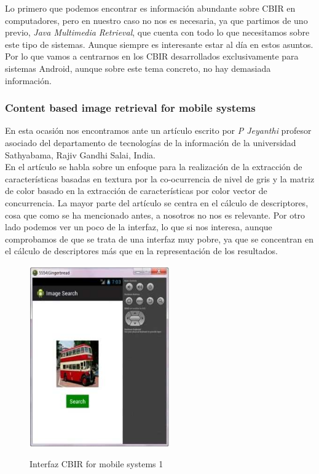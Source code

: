 Lo primero que podemos encontrar es información abundante sobre CBIR en computadores, pero en nuestro caso no nos es necesaria, ya que partimos de uno previo, \textit{Java Multimedia Retrieval}, que cuenta con todo lo que necesitamos sobre este tipo de sistemas. Aunque siempre es interesante estar al día en estos asuntos.\\

Por lo que vamos a centrarnos en los CBIR desarrollados exclusivamente para sistemas Android, aunque sobre este tema concreto, no hay demasiada información.

\subsubsection{Content based image retrieval for mobile systems}

En esta ocasión nos encontramos ante un artículo escrito por \textit{P Jeyanthi} profesor asociado del departamento de tecnologías de la información de la universidad Sathyabama, Rajiv Gandhi Salai, India.\\

En el artículo se habla sobre un enfoque para la realización de la extracción de características basadas en textura por la co-ocurrencia de nivel de gris y la matriz de color basado en la extracción de características por color vector de concurrencia. La mayor parte del artículo se centra en el cálculo de descriptores, cosa que como se ha mencionado antes, a nosotros no nos es relevante. Por otro lado podemos ver un poco de la interfaz, lo que si nos interesa, aunque comprobamos de que se trata de una interfaz muy pobre, ya que se concentran en el cálculo de descriptores más que en la representación de los resultados.


\begin{figure}[H] %
\centering
\includegraphics[scale=0.6]{imagenes/articulo11.png}  %
\label{articulo11}
\caption{Interfaz CBIR for mobile systems 1}
\end{figure}

